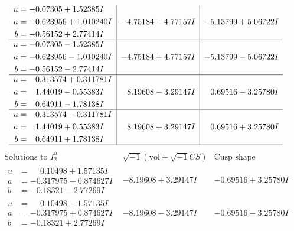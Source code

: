 \documentclass[1p]{elsarticle_modified}
\theoremstyle{definition}
\newcommand{\I}{\sqrt{-1}}
\begin{document}
$$\begin{array}{c|c|c}
\begin{aligned}
u &= -0.07305 + 1.52385 I \\
a &= -0.623956 + 1.010240 I \\
b &= -0.56152 + 2.77414 I\end{aligned}
 & -4.75184 - 4.77157 I & -5.13799 + 5.06722 I \\ \hline\begin{aligned}
u &= -0.07305 - 1.52385 I \\
a &= -0.623956 - 1.010240 I \\
b &= -0.56152 - 2.77414 I\end{aligned}
 & -4.75184 + 4.77157 I & -5.13799 - 5.06722 I \\ \hline\begin{aligned}
u &= \phantom{-}0.313574 + 0.311781 I \\
a &= \phantom{-}1.44019 - 0.55383 I \\
b &= \phantom{-}0.64911 - 1.78138 I\end{aligned}
 & \phantom{-}8.19608 - 3.29147 I & \phantom{-}0.69516 - 3.25780 I \\ \hline\begin{aligned}
u &= \phantom{-}0.313574 - 0.311781 I \\
a &= \phantom{-}1.44019 + 0.55383 I \\
b &= \phantom{-}0.64911 + 1.78138 I\end{aligned}
 & \phantom{-}8.19608 + 3.29147 I & \phantom{-}0.69516 + 3.25780 I\\
 \hline 
 \end{array}$$\newpage$$\begin{array}{c|c|c}  
\text{Solutions to }I^u_{2}& \I (\text{vol} + \sqrt{-1}CS) & \text{Cusp shape}\\
 \hline 
\begin{aligned}
u &= \phantom{-}0.10498 + 1.57135 I \\
a &= -0.317975 - 0.874627 I \\
b &= -0.18321 - 2.77269 I\end{aligned}
 & -8.19608 + 3.29147 I & -0.69516 + 3.25780 I \\ \hline\begin{aligned}
u &= \phantom{-}0.10498 - 1.57135 I \\
a &= -0.317975 + 0.874627 I \\
b &= -0.18321 + 2.77269 I\end{aligned}
 & -8.19608 - 3.29147 I & -0.69516 - 3.25780 I \\ \hline\begin{aligned}

\end{aligned}
\end{array}$$
\end{document}
